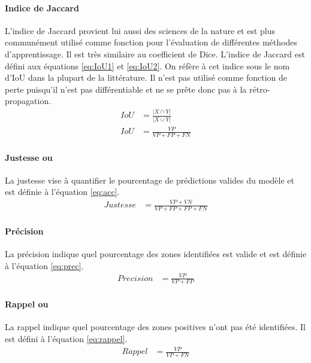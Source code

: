       \paragraph{Indice de Jaccard} L'indice de Jaccard provient lui aussi des sciences de la nature \parencite{Jaccard:DistributionFlore:1901} et est plus communément utilisé comme fonction pour l'évaluation de différentes méthodes d'apprentissage. Il est très similaire au coefficient de Dice. L'indice de Jaccard est défini aux équations \ref{eq:IoU1} et \ref{eq:IoU2}. On réfère à cet indice sous le nom d'\ac{IoU} dans la plupart de la littérature. Il n'est pas utilisé comme fonction de perte puisqu'il n'est pas différentiable et ne se prête donc pas à la rétro-propagation.
      \begin{align} 
        IoU & = \frac{\lvert X \cap Y \rvert}{\lvert X \cup Y \rvert}\label{eq:IoU1} \\
        IoU & = \frac{VP}{VP + FP + FN}\label{eq:IoU2}
      \end{align}
      \paragraph{Justesse ou  \fg{}} 
      La justesse vise à quantifier le pourcentage de prédictions valides du modèle et est définie à l'équation \ref{eq:acc}\parencite{Wallach:DeepLearning:2024}.
      \begin{align}
        Justesse & = \frac{VP+VN}{VP + FP + FP + FN}\label{eq:acc}
      \end{align}
      \paragraph{Précision}
      La précision indique quel pourcentage des zones identifiées est valide et est définie à l'équation \ref{eq:prec}\parencite{Wallach:DeepLearning:2024}.
      \begin{align}
        Precision & = \frac{VP}{VP + FP}\label{eq:prec}
      \end{align}
      \paragraph{Rappel ou  \fg{}}
      La rappel indique quel pourcentage des zones positives n'ont pas été identifiées. Il est défini à l'équation \ref{eq:rappel}\parencite{Wallach:DeepLearning:2024}.
      \begin{align}
        Rappel & = \frac{VP}{VP + FN}\label{eq:rappel}
      \end{align}
